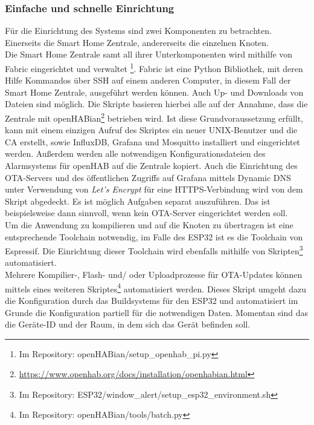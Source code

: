 \documentclass[a4paper,10pt,twocolumn]{article}
\begin{document}
\subsubsection{Einfache und schnelle Einrichtung}
Für die Einrichtung des Systems sind zwei Komponenten zu betrachten. Einerseits die Smart Home Zentrale, andererseits die einzelnen Knoten.\\
Die Smart Home Zentrale samt all ihrer Unterkomponenten wird mithilfe von Fabric eingerichtet und verwaltet \footnote{Im Repository\cite{smarthome2}: \mbox{openHABian/setup\_openhab\_pi.py}}. Fabric ist eine Python Bibliothek, mit deren Hilfe Kommandos über SSH auf einem anderen Computer, in diesem Fall der Smart Home Zentrale, ausgeführt werden können. Auch Up- und Downloads von Dateien sind möglich. Die Skripte basieren hierbei alle auf der Annahme, dass die Zentrale mit openHABian\footnote{\url{https://www.openhab.org/docs/installation/openhabian.html}} betrieben wird. Ist diese Grundvoraussetzung erfüllt, kann mit einem einzigen Aufruf des Skriptes ein neuer UNIX-Benutzer und die \ac{CA} erstellt, sowie InfluxDB, Grafana und Mosquitto installiert und eingerichtet werden. Außerdem werden alle notwendigen Konfigurationsdateien des Alarmsystems für openHAB auf die Zentrale kopiert. Auch die Einrichtung des \ac{OTA}-Servers und des öffentlichen Zugriffs auf Grafana mittels Dynamic DNS unter Verwendung von \textit{Let's Encrypt} für eine \ac{HTTPS}-Verbindung wird von dem Skript abgedeckt. Es ist möglich Aufgaben separat auszuführen. Das ist beispielsweise dann sinnvoll, wenn kein \ac{OTA}-Server eingerichtet werden soll.\\
Um die Anwendung zu kompilieren und auf die Knoten zu übertragen ist eine entsprechende Toolchain notwendig, im Falle des ESP32 ist es die Toolchain von Espressif. Die Einrichtung dieser Toolchain wird ebenfalls mithilfe von Skripten\footnote{Im Repository\cite{smarthome2}: \mbox{ESP32/window\_alert/setup\_esp32\_environment.sh}} automatisiert.\\
Mehrere Kompilier-, Flash- und/ oder Uploadprozesse für \ac{OTA}-Updates können mittels eines weiteren Skriptes\footnote{Im Repository\cite{smarthome2}: \mbox{openHABian/tools/batch.py}} automatisiert werden. Dieses Skript umgeht dazu die Konfiguration durch das Buildsystems für den ESP32 und automatisiert im Grunde die Konfiguration partiell für die notwendigen Daten. Momentan sind das die Geräte-ID und der Raum, in dem sich das Gerät befinden soll.
\end{document}
